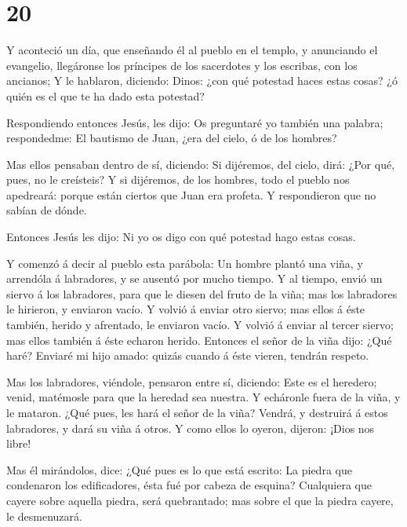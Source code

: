 \hypertarget{section-19}{%
\section{20}\label{section-19}}

 Y aconteció un día, que enseñando él al pueblo en el
templo, y anunciando el evangelio, llegáronse los príncipes de los
sacerdotes y los escribas, con los ancianos;  Y le hablaron,
diciendo: Dinos: ¿con qué potestad haces estas cosas? ¿ó quién es el que
te ha dado esta potestad?

 Respondiendo entonces Jesús, les dijo: Os preguntaré yo
también una palabra; respondedme:  El bautismo de Juan, ¿era
del cielo, ó de los hombres?

 Mas ellos pensaban dentro de sí, diciendo: Si dijéremos,
del cielo, dirá: ¿Por qué, pues, no le creísteis?  Y si
dijéremos, de los hombres, todo el pueblo nos apedreará: porque están
ciertos que Juan era profeta.  Y respondieron que no sabían
de dónde.

 Entonces Jesús les dijo: Ni yo os digo con qué potestad
hago estas cosas.

 Y comenzó á decir al pueblo esta parábola: Un hombre plantó
una viña, y arrendóla á labradores, y se ausentó por mucho tiempo.
 Y al tiempo, envió un siervo á los labradores, para que le
diesen del fruto de la viña; mas los labradores le hirieron, y enviaron
vacío.  Y volvió á enviar otro siervo; mas ellos á éste
también, herido y afrentado, le enviaron vacío.  Y volvió á
enviar al tercer siervo; mas ellos también á éste echaron herido.
 Entonces el señor de la viña dijo: ¿Qué haré? Enviaré mi
hijo amado: quizás cuando á éste vieren, tendrán respeto.

 Mas los labradores, viéndole, pensaron entre sí, diciendo:
Este es el heredero; venid, matémosle para que la heredad sea nuestra.
 Y echáronle fuera de la viña, y le mataron. ¿Qué pues, les
hará el señor de la viña?  Vendrá, y destruirá á estos
labradores, y dará su viña á otros. Y como ellos lo oyeron, dijeron:
¡Dios nos libre!

 Mas él mirándolos, dice: ¿Qué pues es lo que está escrito:
La piedra que condenaron los edificadores, ésta fué por cabeza de
esquina?  Cualquiera que cayere sobre aquella piedra, será
quebrantado; mas sobre el que la piedra cayere, le desmenuzará.

